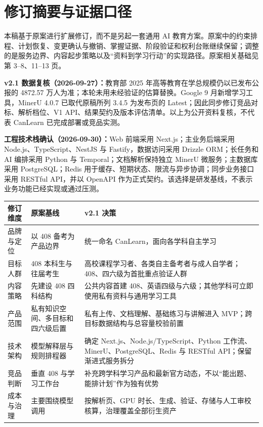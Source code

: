 \documentclass[UTF8,a4paper,11pt,fontset=none]{ctexart}
\newcommand{\cth}[1]{\textbf{\sffamily #1}}
\newenvironment{tbl}{\par\vspace{3pt}\small\noindent\ignorespaces}{\unskip\par\vspace{5pt}}
\begin{document}
\clearpage
\section*{修订摘要与证据口径}
本稿基于原案进行扩展修订，而不是另起一套通用 AI 教育方案。原案中的约束排程、计划恢复、变更确认与撤销、掌握证据、阶段验证和权利台账继续保留；调整的是服务边界、内容起步策略以及“资料到学习行动”的实现路径。原案相关基础见第 3--8、11--13 页。\cite{original}

\textbf{v2.1 数据复核（2026-09-27）：}教育部 2025 年高等教育在学总规模仍以已发布公报的 4872.57 万人为准；本轮未用未经验证的估算替换。Google 9 月新增学习工具，MinerU 4.0.7 已取代原稿所列 3.4.5 为发布页的 Latest；因此同步修订竞品对标、解析档位、V1 API、结果契约及版本评估清单。以上为公开资料复核，不代表 CanLearn 已完成部署或竞品实测。\cite{moe2025,google_sept,mineru_release}

\textbf{工程技术栈确认（2026-09-30）：}Web 前端采用 Next.js；主业务后端采用 Node.js、TypeScript、NestJS 与 Fastify，数据访问采用 Drizzle ORM；长任务和 AI 编排采用 Python 与 Temporal；文档解析保持独立 MinerU 微服务；主数据库采用 PostgreSQL；Redis 用于缓存、短期状态、限流与异步协调；同步业务接口采用 RESTful API，并以 OpenAPI 作为正式契约。该选择是研发基线，不表示业务功能已经实现或通过压测。

\begin{tbl}
\begin{tabularx}{\linewidth}{@{}L{24mm}YY@{}}
\toprule
\cth{修订维度}&\cth{原案基线}&\cth{v2.1 决策}\\\midrule
品牌与定位&以 408 备考为产品边界&统一命名 CanLearn，面向各学科自主学习\\
目标人群&408 本科生与往届考生&高校课程学习者、各类自主备考者与成人自学者；408、四六级为首批重点验证人群\\
内容策略&先建设 408 四科结构&公共内容首建 408、英语四级与六级；其他学科可立即使用私有资料与通用学习工具\\
产品范围&私有知识空间、多目标和四六级后置&私有上传、文档理解、基础练习与讲解进入 MVP；跨目标数据结构与总容量校验前置\\
技术架构&模型解释层与规则排程器&确定 Next.js、Node.js/TypeScript、Python 工作流、MinerU、PostgreSQL、Redis 与 RESTful API；保留渐进式服务拆分\\
竞品判断&垂直 408 与学习工作台&补充跨学科学习产品和最新官方动态，不以“能出题、能排计划”作为独有优势\\
成本与治理&主要围绕模型调用&按解析页、GPU 时长、生成、验证、存储与人工审校核算，治理覆盖全部衍生资产\\
\bottomrule
\end{tabularx}
\end{tbl}
\end{document}
